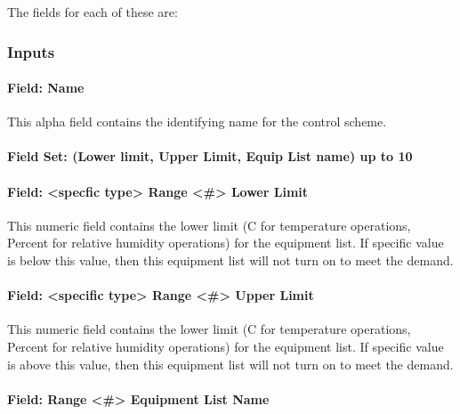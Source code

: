 The fields for each of these are:

\subsubsection{Inputs}\label{inputs-8-015}

\paragraph{Field: Name}\label{field-name-4-019}

This alpha field contains the identifying name for the control scheme.

\paragraph{Field Set: (Lower limit, Upper Limit, Equip List name) up to 10}\label{field-set-lower-limit-upper-limit-equip-list-name-up-to-10-1}

\paragraph{Field: \textless{}specfic type\textgreater{} Range \textless{}\#\textgreater{} Lower Limit}\label{field-specfic-type-range-lower-limit}

This numeric field contains the lower limit (C for temperature operations, Percent for relative humidity operations) for the equipment list. If specific value is below this value, then this equipment list will not turn on to meet the demand.

\paragraph{Field: \textless{}specific type\textgreater{} Range \textless{}\#\textgreater{} Upper Limit}\label{field-specific-type-range-upper-limit}

This numeric field contains the lower limit (C for temperature operations, Percent for relative humidity operations) for the equipment list. If specific value is above this value, then this equipment list will not turn on to meet the demand.

\paragraph{Field: Range \textless{}\#\textgreater{} Equipment List Name}\label{field-range-equipment-list-name-1}

